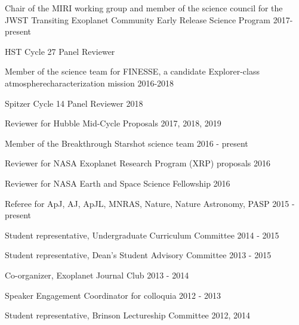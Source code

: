 \documentclass[12pt,letterpaper]{article}
\begin{document}
\begin{compactitem}[]
\item {Chair of the MIRI working group and member of the science council for the \newline JWST Transiting Exoplanet Community Early Release Science Program \hfill 2017- present}
\item{HST Cycle 27 Panel Reviewer}
\item {Member of the science team for FINESSE, a candidate Explorer-class atmosphere\newline characterization mission \hfill 2016-2018}
\item {Spitzer Cycle 14 Panel Reviewer \hfill 2018}
\item {Reviewer for Hubble Mid-Cycle Proposals \hfill 2017, 2018, 2019}
\item {Member of the Breakthrough Starshot science team \hfill 2016 - present}
\item Reviewer for NASA Exoplanet Research Program (XRP) proposals \hfill	2016
\item Reviewer for NASA Earth and Space Science Fellowship \hfill 2016
\item Referee for ApJ, AJ, ApJL, MNRAS, Nature, Nature Astronomy, PASP \hfill 2015 - present
\item Student representative, Undergraduate Curriculum Committee \hfill 2014 - 2015
\item Student representative, Dean's Student Advisory Committee \hfill 2013 - 2015
\item Co-organizer, Exoplanet Journal Club \hfill 2013 - 2014
\item Speaker Engagement Coordinator for colloquia \hfill 2012 - 2013
\item Student representative, Brinson Lectureship Committee \hfill 2012, 2014
\end{compactitem}
\end{document}
